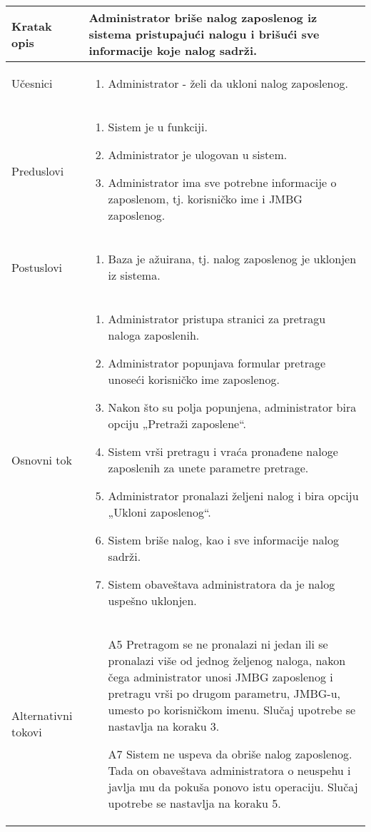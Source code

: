 \documentclass[../main.tex]{subfiles}
\begin{document}
\begin{longtable}{| p{} | p{} |} 

\hline
    Kratak opis &  Administrator briše nalog zaposlenog iz sistema pristupajući nalogu i brišući sve informacije koje nalog sadrži.\\ 
\hline    
    Učesnici & 
    	\begin{enumerate}
        \item Administrator - želi da ukloni nalog zaposlenog.
     \end{enumerate}\\
\hline
   Preduslovi & \begin{enumerate}
       \item Sistem je u funkciji.
       \item Administrator je ulogovan u sistem.
       \item Administrator ima sve potrebne informacije o zaposlenom, tj. korisničko ime i JMBG zaposlenog.
   \end{enumerate}\\
\hline  
    Postuslovi & \begin{enumerate}
        \item Baza je ažuirana, tj. nalog zaposlenog je uklonjen iz sistema.
    \end{enumerate}\\
\hline
    Osnovni tok & \begin{enumerate}
        \item Administrator pristupa stranici za pretragu naloga zaposlenih.
        \item Administrator popunjava formular pretrage unoseći korisničko ime zaposlenog.
        \item Nakon što su polja popunjena, administrator bira opciju „Pretraži zaposlene“.
        \item Sistem vrši pretragu i vraća pronađene naloge zaposlenih za unete parametre pretrage.
        \item Administrator pronalazi željeni nalog i bira opciju „Ukloni zaposlenog“.
        \item Sistem briše nalog, kao i sve informacije nalog sadrži.
        \item Sistem obaveštava administratora da je nalog uspešno uklonjen.
    \end{enumerate}\\
\hline
    Alternativni tokovi & \begin{itemize}
        \item[A5]  Pretragom se ne pronalazi ni jedan ili se pronalazi više od jednog željenog naloga, nakon čega administrator unosi JMBG zaposlenog i pretragu vrši po drugom parametru, JMBG-u, umesto po korisničkom imenu. Slučaj upotrebe se nastavlja na koraku 3.
        \item[A7]  Sistem ne uspeva da obriše nalog zaposlenog. Tada on obaveštava administratora o neuspehu i javlja mu da pokuša ponovo istu operaciju. Slučaj upotrebe se nastavlja na koraku 5.


\end{itemize}
\end{longtable}
\end{document}
